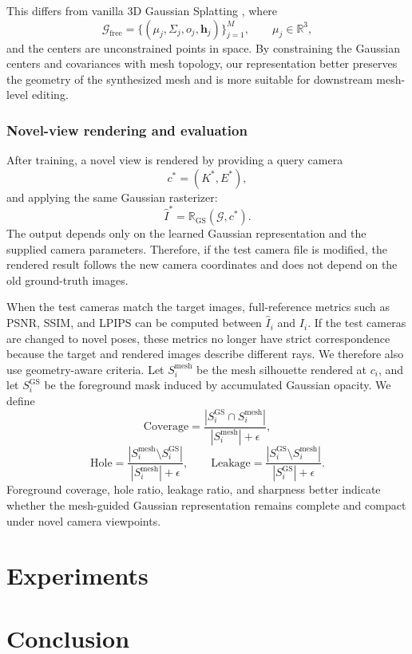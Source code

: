 \documentclass{article}
\begin{document}
This differs from vanilla 3D Gaussian Splatting \cite{kerbl3Dgaussians}, where
\begin{equation}
\mathcal{G}_{\mathrm{free}}
=
\{(\mu_j,\Sigma_j,o_j,\mathbf{h}_j)\}_{j=1}^{M},
\qquad
\mu_j\in\mathbb{R}^{3},
\end{equation}
and the centers are unconstrained points in space. By constraining the Gaussian centers and covariances with mesh topology, our representation better preserves the geometry of the synthesized mesh and is more suitable for downstream mesh-level editing.

\subsubsection{Novel-view rendering and evaluation}
After training, a novel view is rendered by providing a query camera
\begin{equation}
c^{*}=(K^{*},E^{*}),
\end{equation}
and applying the same Gaussian rasterizer:
\begin{equation}
\hat{I}^{*}
=
\mathbb{R}_{\mathrm{GS}}(\mathcal{G},c^{*}).
\end{equation}
The output depends only on the learned Gaussian representation and the supplied camera parameters. Therefore, if the test camera file is modified, the rendered result follows the new camera coordinates and does not depend on the old ground-truth images.

When the test cameras match the target images, full-reference metrics such as PSNR, SSIM, and LPIPS can be computed between $\hat{I}_i$ and $I_i$. If the test cameras are changed to novel poses, these metrics no longer have strict correspondence because the target and rendered images describe different rays. We therefore also use geometry-aware criteria. Let $S_i^{\mathrm{mesh}}$ be the mesh silhouette rendered at $c_i$, and let $S_i^{\mathrm{GS}}$ be the foreground mask induced by accumulated Gaussian opacity. We define
\begin{equation}
\mathrm{Coverage}
=
\frac{|S_i^{\mathrm{GS}}\cap S_i^{\mathrm{mesh}}|}
{|S_i^{\mathrm{mesh}}|+\epsilon},
\end{equation}
\begin{equation}
\mathrm{Hole}
=
\frac{|S_i^{\mathrm{mesh}}\setminus S_i^{\mathrm{GS}}|}
{|S_i^{\mathrm{mesh}}|+\epsilon},
\qquad
\mathrm{Leakage}
=
\frac{|S_i^{\mathrm{GS}}\setminus S_i^{\mathrm{mesh}}|}
{|S_i^{\mathrm{GS}}|+\epsilon}.
\end{equation}
Foreground coverage, hole ratio, leakage ratio, and sharpness better indicate whether the mesh-guided Gaussian representation remains complete and compact under novel camera viewpoints.


\section{Experiments}

\section{Conclusion}



\end{document}
